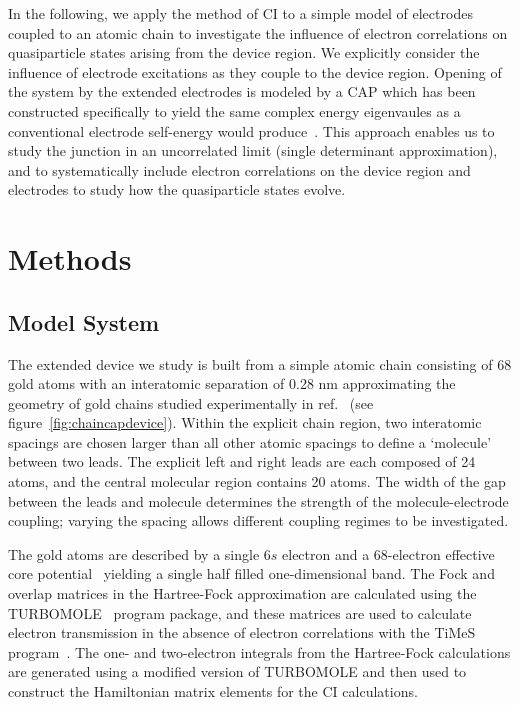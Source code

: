 In the following, we apply the method of \ac{CI} to a simple model of
electrodes coupled to an atomic chain to investigate the influence of
electron correlations on quasiparticle states arising from the device
region. We explicitly consider the influence of electrode excitations as
they couple to the device region. Opening of the system by the extended
electrodes is modeled by a \ac{CAP} which has been constructed specifically
to yield the same complex energy eigenvaules as a conventional electrode
self-energy would produce~\cite{henderson}. This approach enables us to study
the junction in an uncorrelated limit (single determinant approximation), and
to systematically include electron correlations on the device region and
electrodes to study how the quasiparticle states evolve. 

\section{Methods}
\label{sec:method}

\subsection{Model System}
\label{subsec:modelsystem}

The extended device we study is built from a simple atomic chain
consisting of 68 gold atoms with an interatomic separation of 0.28 nm
approximating the geometry of gold chains studied experimentally in
ref.~\cite{nilius2002science} (see figure~\ref{fig:chaincapdevice}).
Within the explicit chain region, two interatomic spacings are chosen
larger than all other atomic spacings to define a `molecule' between two
leads. The explicit left and right leads are each composed of 24 atoms,
and the central molecular region contains 20 atoms. The width of the gap
between the leads and molecule determines the strength of the
molecule-electrode coupling; varying the spacing allows different
coupling regimes to be investigated. 

The gold atoms are described by a single 6$s$ electron and a 68-electron
effective core potential~\cite{CRENBS} yielding a single half filled
one-dimensional band. The Fock and overlap matrices in the Hartree-Fock
approximation are calculated  using the TURBOMOLE~\cite{turbomole} program
package, and these matrices are used to calculate electron transmission
in the absence of electron correlations with the TiMeS  program~\cite{times}.
The one- and two-electron integrals from the Hartree-Fock calculations
are generated using a modified version of TURBOMOLE and then used to
construct the Hamiltonian matrix elements for the CI calculations.

